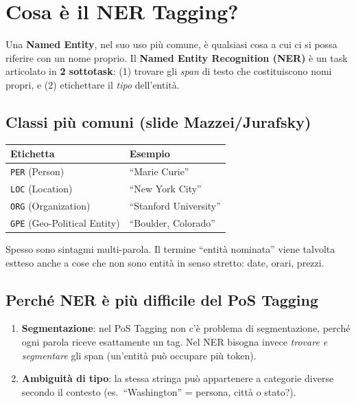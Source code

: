 \documentclass[12pt,a4paper]{article}
\begin{document}
\section{Cosa è il NER Tagging?}

Una \textbf{Named Entity}, nel suo uso più comune, è qualsiasi cosa a cui ci si possa riferire con un nome proprio. Il \textbf{Named Entity Recognition (NER)} è un task articolato in \textbf{2 sottotask}: (1) trovare gli \emph{span} di testo che costituiscono nomi propri, e (2) etichettare il \emph{tipo} dell'entità.

\subsection{Classi più comuni (slide Mazzei/Jurafsky)}

\begin{center}
\begin{tabular}{ll}
\toprule
\textbf{Etichetta} & \textbf{Esempio} \\
\midrule
\texttt{PER} (Person) & ``Marie Curie'' \\
\texttt{LOC} (Location) & ``New York City'' \\
\texttt{ORG} (Organization) & ``Stanford University'' \\
\texttt{GPE} (Geo-Political Entity) & ``Boulder, Colorado'' \\
\bottomrule
\end{tabular}
\end{center}
Spesso sono sintagmi multi-parola. Il termine ``entità nominata'' viene talvolta estteso anche a cose che non sono entità in senso stretto: date, orari, prezzi.

\subsection{Perché NER è più difficile del PoS Tagging}

\begin{enumerate}[leftmargin=1.5em, label=\arabic*.]
  \item \textbf{Segmentazione}: nel PoS Tagging non c'è problema di segmentazione, perché ogni parola riceve esattamente un tag. Nel NER bisogna invece \emph{trovare e segmentare} gli span (un'entità può occupare più token).
  \item \textbf{Ambiguità di tipo}: la stessa stringa può appartenere a categorie diverse secondo il contesto (es.\ ``Washington'' = persona, città o stato?).
\end{enumerate}
\end{document}
